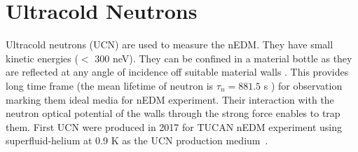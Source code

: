



\section{Ultracold Neutrons}
Ultracold neutrons (UCN) are used to measure the nEDM. They have small kinetic energies ($<$ 300 neV). They can be confined in a material bottle as they are reflected at any angle of incidence off suitable material walls \cite{ucn_storage}. This provides long time frame (the mean lifetime of neutron is $\tau_n=881.5$ s \cite{mike}) for observation marking them ideal media for nEDM experiment. Their interaction with the neutron optical potential of the walls through the strong force enables to trap them. First UCN were produced in 2017 for TUCAN nEDM experiment using superfluid-helium at 0.9 K as the UCN production medium~\cite{TRIUMF_UCN,taraneh_theis}.

